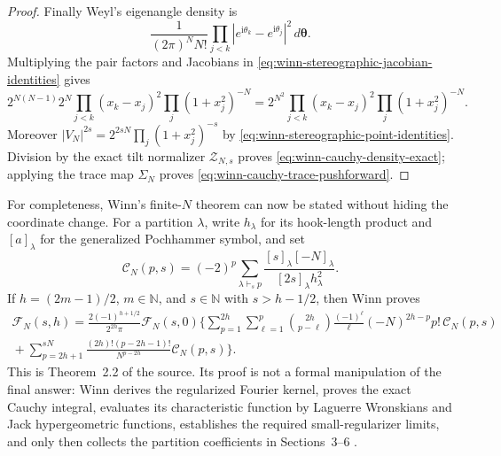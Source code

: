 \begin{proof}
Finally Weyl's eigenangle density is
\[
 \frac1{(2\pi)^N N!}
 \prod_{j<k}|e^{\mathrm i\theta_k}-e^{\mathrm i\theta_j}|^2
 \,d\boldsymbol\theta.
\]
Multiplying the pair factors and Jacobians in
\eqref{eq:winn-stereographic-jacobian-identities} gives
\[
 2^{N(N-1)}2^N
 \prod_{j<k}(x_k-x_j)^2\prod_j(1+x_j^2)^{-N}
 =2^{N^2}\prod_{j<k}(x_k-x_j)^2\prod_j(1+x_j^2)^{-N}.
\]
Moreover
$|V_N|^{2s}=2^{2sN}\prod_j(1+x_j^2)^{-s}$ by
\eqref{eq:winn-stereographic-point-identities}.  Division by the exact tilt
normalizer $\mathcal Z_{N,s}$ proves \eqref{eq:winn-cauchy-density-exact}; applying
the trace map $\Sigma_N$ proves \eqref{eq:winn-cauchy-trace-pushforward}.
\end{proof}

For completeness, Winn's finite-$N$ theorem can now be stated without hiding the
coordinate change.  For a partition $\lambda$, write $h_\lambda$ for its hook-length
product and $[a]_\lambda$ for the generalized Pochhammer symbol, and set
\begin{equation}
 \mathcal C_N(p,s)=(-2)^p
 \sum_{\lambda\vdash_s p}
 \frac{[s]_\lambda[-N]_\lambda}{[2s]_\lambda h_\lambda^2}.
 \label{eq:winn-partition-coefficient}
\end{equation}
If $h=(2m-1)/2$, $m\in\mathbb N$, and $s\in\mathbb N$ with
$s>h-1/2$, then Winn proves
\begin{multline}
 \mathcal F_N(s,h)=
 \frac{2(-1)^{h+1/2}}{2^{2h}\pi}\mathcal F_N(s,0)
 \Bigg\{
 \sum_{p=1}^{2h}\sum_{\ell=1}^{p}
 \binom{2h}{p-\ell}\frac{(-1)^\ell}{\ell}
 (-N)^{2h-p}p!\,\mathcal C_N(p,s)\\
 {}+\sum_{p=2h+1}^{sN}
 \frac{(2h)!(p-2h-1)!}{N^{p-2h}}\mathcal C_N(p,s)
 \Bigg\}.
 \label{eq:winn-finite-N-half-integer-moment}
\end{multline}
This is Theorem~2.2 of the source.  Its proof is not a formal manipulation of the final
answer: Winn derives the regularized Fourier kernel, proves the exact Cauchy integral,
evaluates its characteristic function by Laguerre Wronskians and Jack hypergeometric
functions, establishes the required small-regularizer limits, and only then collects the
partition coefficients in Sections~3--6 \cite[Thm.~2.2 and \S\S3--6]{winn2012}.

